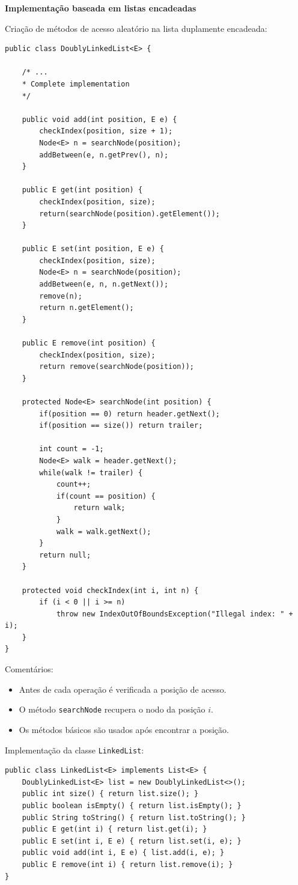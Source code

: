 \medskip

\textbf{Implementação baseada em listas encadeadas}

\medskip

Criação de métodos de acesso aleatório na lista duplamente encadeada:
\begin{verbatim}
public class DoublyLinkedList<E> {
	
	/* ...
	* Complete implementation
	*/
	
	public void add(int position, E e) {
		checkIndex(position, size + 1);
		Node<E> n = searchNode(position);
		addBetween(e, n.getPrev(), n);
	}
	
	public E get(int position) {
		checkIndex(position, size);
		return(searchNode(position).getElement());
	}
	
	public E set(int position, E e) {
		checkIndex(position, size);
		Node<E> n = searchNode(position);
		addBetween(e, n, n.getNext());
		remove(n);
		return n.getElement();
	}
	
	public E remove(int position) {
		checkIndex(position, size);
		return remove(searchNode(position));
	}
	
	protected Node<E> searchNode(int position) {
		if(position == 0) return header.getNext();
		if(position == size()) return trailer;
		
		int count = -1;
		Node<E> walk = header.getNext();
		while(walk != trailer) {
			count++;
			if(count == position) {
				return walk;
			}
			walk = walk.getNext();
		}
		return null;
	}
	
	protected void checkIndex(int i, int n) {
		if (i < 0 || i >= n)
			throw new IndexOutOfBoundsException("Illegal index: " + i);
	}
}
\end{verbatim}

\medskip

{\color{redtext}Comentários:}
\begin{itemize}
	\color{redtext}
	\item Antes de cada operação é verificada a posição de acesso.
	\item O método \texttt{searchNode} recupera o nodo da posição $i$.
	\item Os métodos básicos são usados após encontrar a posição.
\end{itemize}

\medskip

Implementação da classe \texttt{LinkedList}:
\begin{verbatim}
public class LinkedList<E> implements List<E> {
	DoublyLinkedList<E> list = new DoublyLinkedList<>();
	public int size() { return list.size(); }
	public boolean isEmpty() { return list.isEmpty(); }
	public String toString() { return list.toString(); }
	public E get(int i) { return list.get(i); }
	public E set(int i, E e) { return list.set(i, e); }
	public void add(int i, E e) { list.add(i, e); }
	public E remove(int i) { return list.remove(i); }
}
\end{verbatim}

